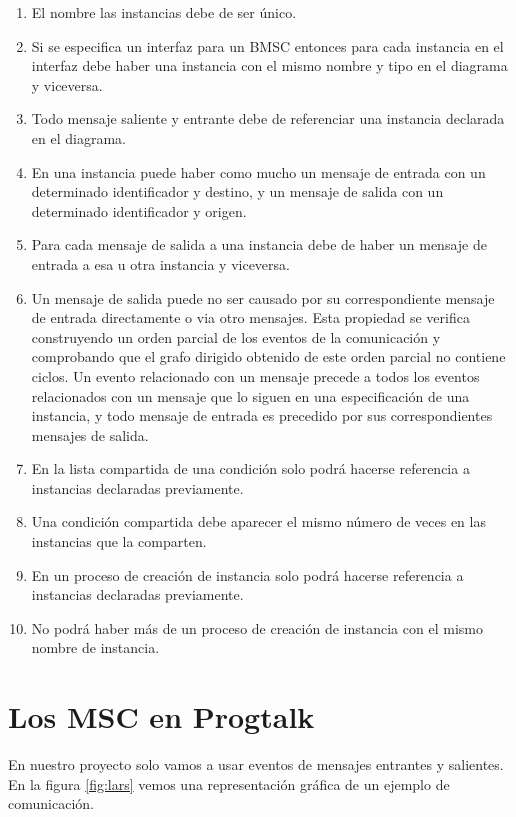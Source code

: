 \begin{enumerate}
\item El nombre las instancias debe de ser único.
\item Si se especifica un interfaz para un BMSC entonces para cada
instancia en el interfaz debe haber una instancia con el mismo 
nombre y tipo en el diagrama y viceversa.
\item Todo mensaje saliente y entrante debe de referenciar una
instancia declarada en el diagrama.
\item En una instancia puede haber como mucho un mensaje de entrada
con un determinado identificador y destino, y un mensaje de salida con
un determinado identificador y origen.
\item Para cada mensaje de salida a una instancia debe de haber un 
mensaje de entrada a esa u otra instancia y viceversa.
\item Un mensaje de salida puede no ser causado por su correspondiente
mensaje de entrada directamente o via otro mensajes.     
Esta propiedad se verifica construyendo un orden parcial de los 
eventos de la comunicación y comprobando que el grafo dirigido 
obtenido de este orden parcial no contiene ciclos. Un evento
relacionado con un mensaje precede a todos los eventos relacionados
con un mensaje que lo siguen en una especificación de una instancia,
y todo mensaje de entrada es precedido por sus correspondientes 
mensajes de salida.
\item En la lista compartida de una condición solo podrá hacerse
referencia a instancias declaradas previamente.
\item Una condición compartida debe aparecer el mismo número de
veces en las instancias que la comparten.
\item En un proceso de creación de instancia solo podrá hacerse
referencia a instancias declaradas previamente.
\item No podrá haber más de un proceso de creación de instancia con
el mismo nombre de instancia.
\end{enumerate}

\section{Los MSC en Progtalk}
En nuestro proyecto solo vamos a usar eventos de mensajes entrantes y
salientes. En la figura \ref{fig:lars} vemos una representación
gráfica de un ejemplo de comunicación.


